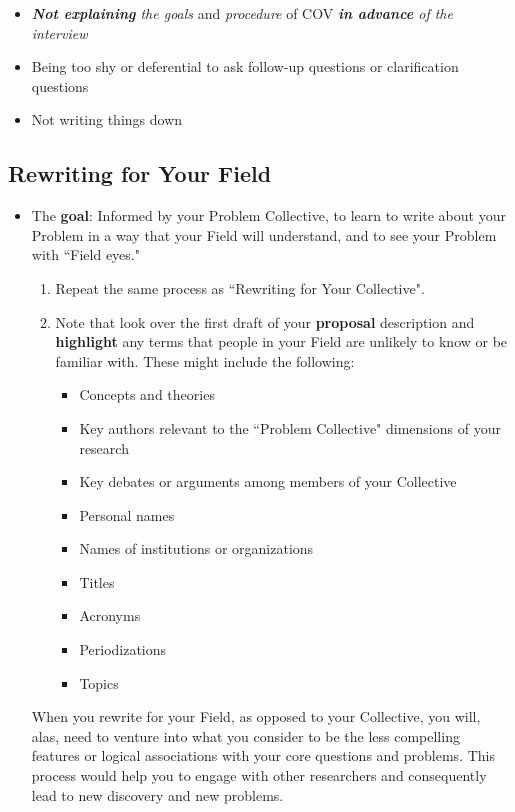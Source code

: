 \documentclass[11pt]{article}
\begin{document}
\begin{itemize}
\begin{itemize}
\item \emph{\textbf{Not explaining} the goals} and \emph{procedure} of COV \emph{\textbf{in advance} of the interview}

\item Being too shy or deferential to ask follow-up questions or clarification questions

\item Not writing things down
\end{itemize}
\end{itemize}
\subsection{Rewriting for Your Field}
\begin{itemize}
\item \begin{exercise}

The \textbf{goal}: Informed by your Problem Collective, to learn to write about your Problem in a way that your Field will understand, and to see your Problem with ``Field eyes."

\begin{enumerate}
\item Repeat the same process as ``Rewriting for Your Collective". 

\item Note that look over the first draft of your \textbf{proposal} description and \textbf{highlight} any terms that people in your Field are unlikely to know or be familiar with. These might include the following:
\begin{itemize}
\item Concepts and theories
\item Key authors relevant to the ``Problem Collective" dimensions of your research
\item Key debates or arguments among members of your Collective
\item Personal names
\item Names of institutions or organizations
\item Titles
\item Acronyms
\item Periodizations
\item Topics
\end{itemize}
\end{enumerate}

When you rewrite for your Field, as opposed to your Collective, you will, alas, need to venture into what you consider to be the less compelling features or logical associations with your core questions and problems. This process would help you to engage with other researchers and consequently lead to new discovery and new problems. 
\end{exercise} 
\end{itemize}
\end{document}

